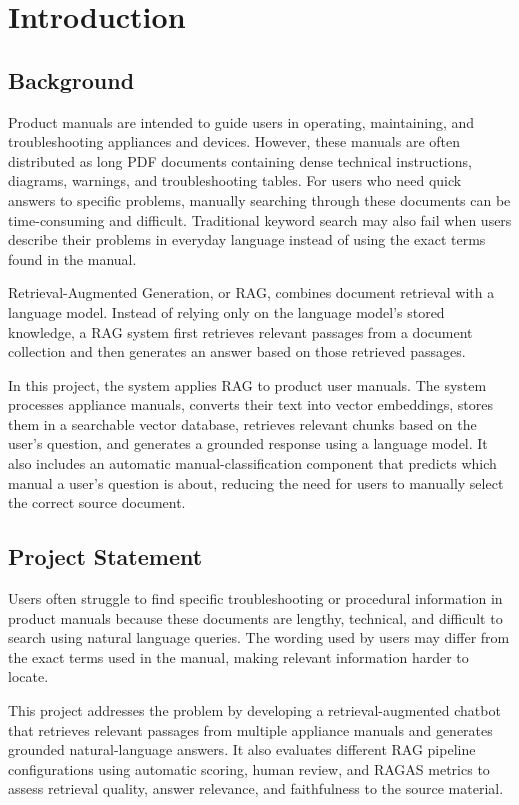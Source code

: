 \section{Introduction}

\subsection{Background}

Product manuals are intended to guide users in operating, maintaining, and troubleshooting appliances and devices. However, these manuals are often distributed as long PDF documents containing dense technical instructions, diagrams, warnings, and troubleshooting tables. For users who need quick answers to specific problems, manually searching through these documents can be time-consuming and difficult. Traditional keyword search may also fail when users describe their problems in everyday language instead of using the exact terms found in the manual.

Retrieval-Augmented Generation, or RAG, combines document retrieval with a language model. Instead of relying only on the language model's stored knowledge, a RAG system first retrieves relevant passages from a document collection and then generates an answer based on those retrieved passages.

In this project, the system applies RAG to product user manuals. The system processes appliance manuals, converts their text into vector embeddings, stores them in a searchable vector database, retrieves relevant chunks based on the user's question, and generates a grounded response using a language model. It also includes an automatic manual-classification component that predicts which manual a user's question is about, reducing the need for users to manually select the correct source document.

\subsection{Project Statement}

Users often struggle to find specific troubleshooting or procedural information in product manuals because these documents are lengthy, technical, and difficult to search using natural language queries. The wording used by users may differ from the exact terms used in the manual, making relevant information harder to locate.

This project addresses the problem by developing a retrieval-augmented chatbot that retrieves relevant passages from multiple appliance manuals and generates grounded natural-language answers. It also evaluates different RAG pipeline configurations using automatic scoring, human review, and RAGAS metrics to assess retrieval quality, answer relevance, and faithfulness to the source material.

